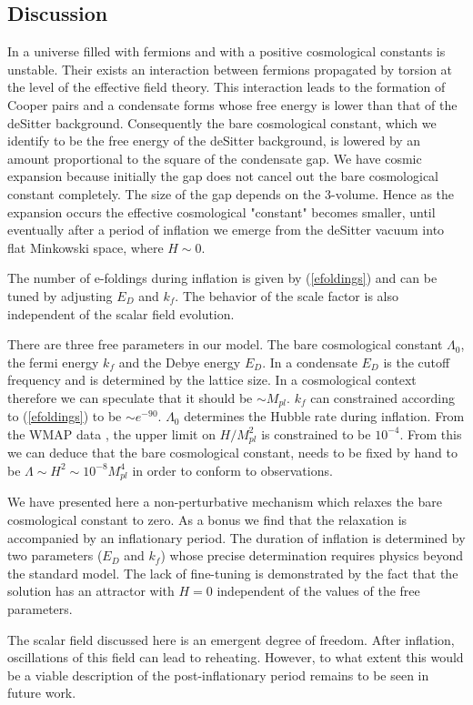\begin{doublespace}
\section{Discussion}

In a universe filled with fermions and with a positive cosmological
constants is unstable. Their exists an interaction between fermions
propagated by torsion at the level of the effective field theory.
This interaction leads to the formation of Cooper pairs and a
condensate forms whose free energy is lower than that of the
deSitter background. Consequently the bare cosmological constant,
which we identify to be the free energy of the deSitter background,
is lowered by an amount proportional to the square of the condensate
gap. We have cosmic expansion because initially the gap does not
cancel out the bare cosmological constant completely. The size of
the gap depends on the 3-volume. Hence as the expansion occurs the
effective cosmological "constant" becomes smaller, until eventually
after a period of inflation we emerge from the deSitter vacuum into
flat Minkowski space, where $H \sim 0$.

The number of e-foldings during inflation is given by
(\ref{efoldings}) and can be tuned by adjusting $E_D$ and $k_f$. The
behavior of the scale factor is also independent of the scalar field
evolution.

There are three free parameters in our model. The bare cosmological
constant $\Lambda_0$, the fermi energy $k_f$ and the Debye energy
$E_D$. In a condensate $E_D$ is the cutoff frequency and is
determined by the lattice size. In a cosmological context therefore
we can speculate that it should be $\sim M_{pl}$. $k_f$ can
constrained according to (\ref{efoldings}) to be $\sim e^{-90}$.
$\Lambda_0$ determines the Hubble rate during inflation. From the
WMAP data \cite{Spergel2006Wilkinson}, the upper limit on $H/M_{pl}^2$ is
constrained to be $10^{-4}$. From this we can deduce that the bare
cosmological constant, needs to be fixed by hand to be $\Lambda \sim
H^2 \sim 10^{-8} M_{pl}^4$ in order to conform to observations.

We have presented here a non-perturbative mechanism which relaxes
the bare cosmological constant to zero.  As a bonus we find that the
relaxation is accompanied by an inflationary period. The duration of
inflation is determined by two parameters ($E_D$ and $k_f$) whose
precise determination requires physics beyond the standard model.
The lack of fine-tuning is demonstrated by the fact that the
solution has an attractor with $H=0$ independent of the values of
the free parameters.

The scalar field discussed here is an emergent degree of freedom.
After inflation, oscillations of this field can lead to reheating.
However, to what extent this would be a viable description of the
post-inflationary period remains to be seen in future work.

\end{doublespace}